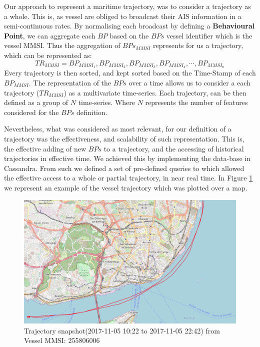 Our approach to represent a maritime trajectory, was to consider a trajectory as a whole. This is, as vessel are obliged to broadcast their AIS information in a semi-continuous rates. By normalising each broadcast by defining a \textbf{Behavioural Point}, we can aggregate each $BP$ based on the $BPs$ vessel identifier which is the vessel MMSI. Thus the aggregation of $BPs_{MMSI}$ represents for us a trajectory, which can be represented as:
\[TR_{MMSI} = BP_{MMSI_1}, BP_{MMSI_2}, BP_{MMSI_3}, BP_{MMSI_4}, \cdots , BP_{MMSI_n}\]
Every trajectory is then sorted, and kept sorted based on the Time-Stamp of each $BP_{MMSI}$. The representation of the $BPs$ over a time allows us to consider a each trajectory ($TR_{MMSI}$) as a multivariate time-series.
Each trajectory, can be then defined as a group of $N$ time-series. Where $N$ represents the number of features considered for the $BPs$ definition.

Nevertheless, what was considered as most relevant, for our definition of a trajectory was the effectiveness, and scalability of such representation. This is, the effective adding of new $BPs$ to a trajectory, and the accessing of historical trajectories in effective time. We achieved this by implementing the data-base in Cassandra. From such we defined a set of pre-defined queries to which allowed the effective access to a whole or partial trajectory, in near real time.
In Figure \ref{fig: TrajectorySMM_example} we represent an example of the vessel trajectory which was plotted over a map. 

\begin{figure}[H]
	\centering
	\includegraphics[scale = .33]{figures/Ch3/traj_example.png}
    \caption{Trajectory snapshot(2017-11-05 10:22 to 2017-11-05 22:42) from Vessel MMSI: 255806006}
    \label{fig: TrajectorySMM_example}
\end{figure}


